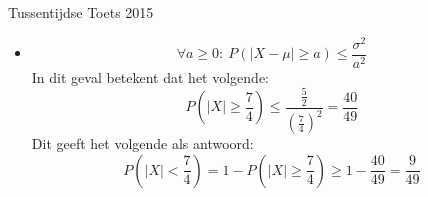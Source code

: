 \documentclass[main.tex]{subfiles}
\begin{document}
\begin{examenvraag}{Tussentijdse Toets 2015}
\begin{ex-antwoord}
\begin{itemize}
      De variantie is dus $\frac{10}{4}$.
    \item {}
      \[ \forall a \ge 0:\ P(|X-\mu| \ge a) \le \frac{\sigma^{2}}{a^{2}} \]
      In dit geval betekent dat het volgende:
      \[ P\left(|X| \ge \frac{7}{4}\right) \le \frac{\frac{5}{2}}{\left(\frac{7}{4}\right)^{2}} = \frac{40}{49} \]
      Dit geeft het volgende als antwoord:
      \[ P\left( |X| < \frac{7}{4} \right) = 1 - P\left(|X| \ge \frac{7}{4}\right) \ge 1 - \frac{40}{49} = \frac{9}{49} \]
    \end{itemize}
  \end{ex-antwoord}
\end{examenvraag}
\end{document}
